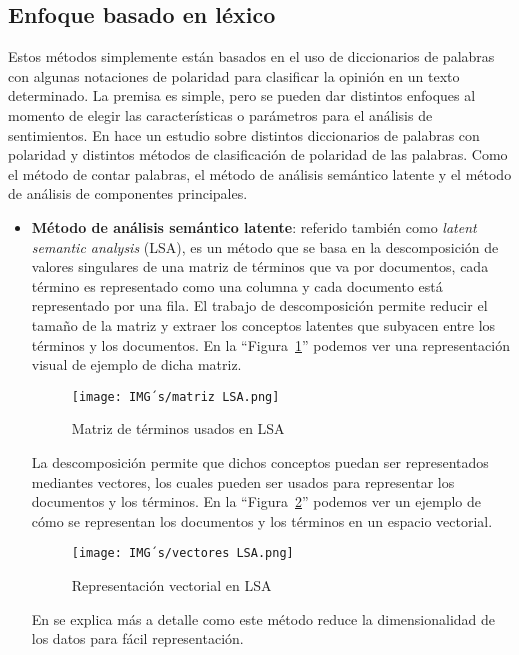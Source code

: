 \documentclass[12pt, conference]{IEEEtran}
\begin{document}
\subsection{Enfoque basado en léxico}
Estos métodos simplemente están basados en el uso de diccionarios de palabras con algunas notaciones de polaridad para clasificar la opinión en un texto determinado. La premisa es simple, pero se pueden dar distintos enfoques al momento de elegir las características o parámetros para el análisis de sentimientos. En \cite{f7} hace un estudio sobre distintos diccionarios de palabras con polaridad y distintos métodos de clasificación de polaridad de las palabras. Como el método de contar palabras, el método de análisis semántico latente y el método de análisis de componentes principales.
\begin{itemize}
  \item \textbf{Método de análisis semántico latente}: referido también como \textit{latent semantic analysis} (LSA), es un método que se basa en la descomposición de valores singulares de una matriz de términos que va por documentos, cada término es representado como una columna y cada documento está representado por una fila. El trabajo de descomposición permite reducir el tamaño de la matriz y extraer los conceptos latentes que subyacen entre los términos y los documentos. En la ``Figura~\ref{fig5}'' podemos ver una representación visual de ejemplo de dicha matriz.
  \begin{figure}[htbp]
    \caption{Matriz de términos usados en LSA}
    \centerline{\texttt{[image: IMG´s/matriz LSA.png]}}
    \label{fig5}
  \end{figure}
  La descomposición permite que dichos conceptos puedan ser representados mediantes vectores, los cuales pueden ser usados para representar los documentos y los términos. En la ``Figura~\ref{fig6}'' podemos ver un ejemplo de cómo se representan los documentos y los términos en un espacio vectorial.
  \begin{figure}[htbp]
    \caption{Representación vectorial en LSA }
    \centerline{\texttt{[image: IMG´s/vectores LSA.png]}}
    \label{fig6}
  \end{figure}
  En \cite{f9} se explica más a detalle como este método reduce la dimensionalidad de los datos para fácil representación.


\end{itemize}
\end{document}
